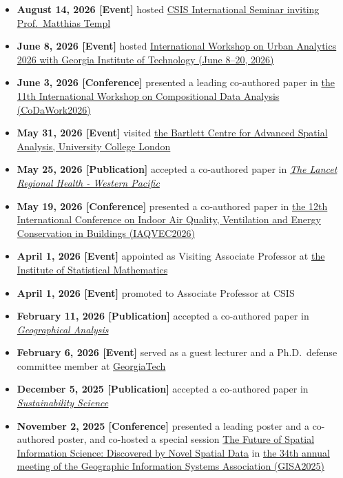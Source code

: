 \documentclass[
]{book}
\providecommand{\tightlist}{%
  \setlength{\itemsep}{0pt}\setlength{\parskip}{0pt}}
\begin{document}
\begin{itemize}
\tightlist
\item
  \textbf{August 14, 2026 {[}Event{]}} hosted \href{https://www.csis.u-tokyo.ac.jp/event/csis_international_seminar_aug14_202608/}{CSIS International Seminar inviting Prof.~Matthias Templ}
\item
  \textbf{June 8, 2026 {[}Event{]}} hosted \href{https://www.csis.u-tokyo.ac.jp/news/urban_analytics_workshop_202606/}{International Workshop on Urban Analytics 2026 with Georgia Institute of Technology (June 8--20, 2026)}
\item
  \textbf{June 3, 2026 {[}Conference{]}} presented a leading co-authored paper in \href{https://www.coda-association.org/en/codawork2026/}{the 11th International Workshop on Compositional Data Analysis (CoDaWork2026)}
\item
  \textbf{May 31, 2026 {[}Event{]}} visited \href{https://www.ucl.ac.uk/bartlett/casa}{the Bartlett Centre for Advanced Spatial Analysis, University College London}
\item
  \textbf{May 25, 2026 {[}Publication{]}} accepted a co-authored paper in \href{https://www.sciencedirect.com/science/article/pii/S2666606526001057}{\emph{The Lancet Regional Health - Western Pacific}}
\item
  \textbf{May 19, 2026 {[}Conference{]}} presented a co-authored paper in \href{https://iaqvec2026.org/}{the 12th International Conference on Indoor Air Quality, Ventilation and Energy Conservation in Buildings (IAQVEC2026)}
\item
  \textbf{April 1, 2026 {[}Event{]}} appointed as Visiting Associate Professor at \href{https://www.ism.ac.jp/index_e.html}{the Institute of Statistical Mathematics}
\item
  \textbf{April 1, 2026 {[}Event{]}} promoted to Associate Professor at CSIS
\item
  \textbf{February 11, 2026 {[}Publication{]}} accepted a co-authored paper in \href{https://onlinelibrary.wiley.com/doi/10.1111/gean.70034}{\emph{Geographical Analysis}}
\item
  \textbf{February 6, 2026 {[}Event{]}} served as a guest lecturer and a Ph.D.~defense committee member at \href{https://planning.gatech.edu/}{GeorgiaTech}
\item
  \textbf{December 5, 2025 {[}Publication{]}} accepted a co-authored paper in \href{https://link.springer.com/article/10.1007/s11625-025-01788-3}{\emph{Sustainability Science}}
\item
  \textbf{November 2, 2025 {[}Conference{]}} presented a leading poster and a co-authored poster, and co-hosted a special session \href{https://www.csis.u-tokyo.ac.jp/news/gisa_special_session_2025/}{The Future of Spatial Information Science: Discovered by Novel Spatial Data} in \href{https://pub.confit.atlas.jp/en/event/gisa2025}{the 34th annual meeting of the Geographic Information Systems Association (GISA2025)}

\end{itemize}
\end{document}
